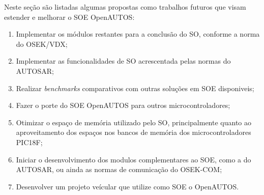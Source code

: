 Neste seção são listadas algumas propostas como trabalhos futuros que visam estender e melhorar o SOE OpenAUTOS:

\begin{enumerate}
	\item Implementar os módulos restantes para a conclusão do SO, conforme a norma do OSEK/VDX;
	\item Implementar as funcionalidades de SO acrescentada pelas normas do AUTOSAR;
	\item Realizar \emph{benchmarks} comparativos com outras soluções em SOE disponiveis;
	\item Fazer o porte do SOE OpenAUTOS para outros microcontroladores;
	\item Otimizar o espaço de memória utilizado pelo SO, principalmente quanto ao aproveitamento dos espaços nos bancos de memória dos microcontroladores PIC18F;
	\item Iniciar o desenvolvimento dos modulos complementares ao SOE, como a  do AUTOSAR, ou ainda as normas de comunicação do OSEK-COM;
	\item Desenvolver um projeto veícular que utilize como SOE o OpenAUTOS.
\end{enumerate}
